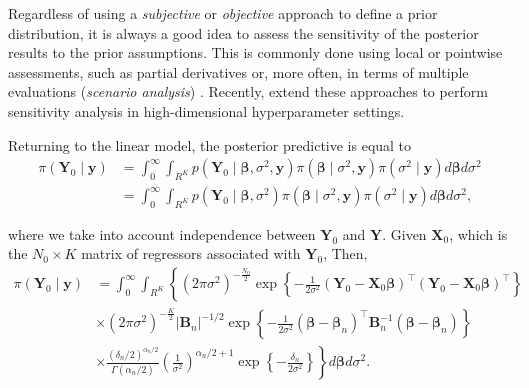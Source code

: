 Regardless of using a \textit{subjective} or \textit{objective} approach to define a prior distribution, it is always a good idea to assess the sensitivity of the posterior results to the prior assumptions. This is commonly done using local or pointwise assessments, such as partial derivatives \cite{giordano2022evaluating,Jacobi2022,gustafson2000local} or, more often, in terms of multiple evaluations (\textit{scenario analysis}) \cite{richardson1997bayesian, kim1999has, an2007bayesian}. Recently, \cite{jacobi2024posterior} extend these approaches to perform sensitivity analysis in high-dimensional hyperparameter settings. 

Returning to the linear model, the posterior predictive is equal to
\begin{align*}
	\pi({\bm{Y}}_0\mid {\bm{y}})&=\int_{0}^{\infty}\int_{R^K}p({\bm{Y}}_0\mid \bm{\beta},\sigma^2,{\bm{y}})\pi(\bm{\beta}\mid \sigma^2,{\bm{y}})\pi(\sigma^2\mid {\bm{y}})d\bm{\beta} d\sigma^2\\
	&=\int_{0}^{\infty}\int_{R^K}p({\bm{Y}}_0\mid \bm{\beta},\sigma^2)\pi(\bm{\beta}\mid \sigma^2,{\bm{y}})\pi(\sigma^2\mid {\bm{y}})d\bm{\beta} d\sigma^2,
\end{align*}

where we take into account independence between ${\bm{Y}}_0$ and ${\bm{Y}}$. Given ${\bm{X}}_0$, which is the $N_0\times K$ matrix of regressors associated with ${\bm{Y}}_0$, Then,
\begin{align*}
	\pi({\bm{Y}}_0\mid {\bm{y}})&=\int_{0}^{\infty}\int_{R^K}\left\{ (2\pi\sigma^2)^{-\frac{N_0}{2}} \exp \left\{-\frac{1}{2\sigma^2} ({\bm{Y}}_0 - {\bm{X}}_0\bm{\beta})^{\top}({\bm{Y}}_0 - {\bm{X}}_0\bm{\beta})^{\top} \right\}\right. \\
	& \times (2\pi\sigma^2)^{-\frac{K}{2}} |{\bm{B}}_n|^{-1/2} \exp \left\{-\frac{1}{2\sigma^2} (\bm{\beta} - \bm{\beta}_n)^{\top}{\bm{B}}_n^{-1}(\bm{\beta} - \bm{\beta}_n)\right\} \\
	& \left. \times \frac{(\delta_n/2)^{\alpha_n/2}}{\Gamma(\alpha_n/2)}\left(\frac{1}{\sigma^2}\right)^{\alpha_n/2+1}\exp \left\{-\frac{\delta_n}{2\sigma^2} \right\}\right\}d\bm{\beta} d\sigma^2. \\
\end{align*}


